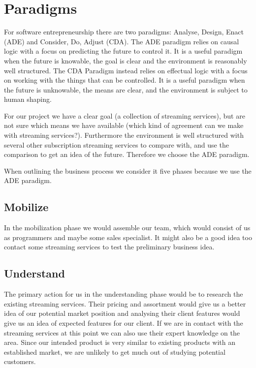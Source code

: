 \section{Paradigms}
\label{sec:paradigms}
For software entrepreneurship there are two paradigms: Analyse, Design, Enact (ADE) and Consider, Do, Adjust (CDA).
The ADE paradigm relies on causal logic with a focus on predicting the future to control it.
It is a useful paradigm when the future is knowable, the goal is clear and the environment is reasonably well structured.
The CDA Paradigm instead relies on effectual logic with a focus on working with the things that can be controlled.
It is a useful paradigm when the future is unknowable, the means are clear, and the environment is subject to human shaping.

For our project we have a clear goal (a collection of streaming services), but are not sure which means we have available (which kind of agreement can we make with streaming services?).
Furthermore the environment is well structured with several other subscription streaming services to compare with, and use the comparison to get an idea of the future.
Therefore we choose the ADE paradigm.

When outlining the business process we consider it five phases because we use the ADE paradigm.

\subsection{Mobilize}
In the mobilization phase we would assemble our team, which would consist of us as programmers and maybe some sales specialist. It might also be a good idea too contact some streaming services to test the preliminary business idea.

\subsection{Understand}
The primary action for us in the understanding phase would be to research the existing streaming services. Their pricing and assortment would give us a better idea of our potential market position and analysing their client features would give us an idea of expected features for our client.
If we are in contact with the streaming services at this point we can also use their expert knowledge on the area.
Since our intended product is very similar to existing products with an established market, we are unlikely to get much out of studying potential customers.

